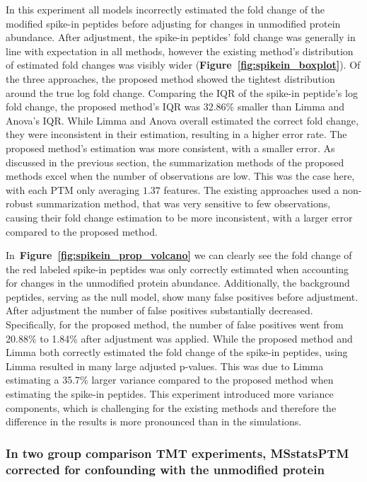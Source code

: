 \documentclass[mcp]{article}
\numberwithin{table}{section}
\def\figref#1{{\bf Figure~\ref{fig:#1}}}
\begin{document}
In this experiment all models incorrectly estimated the fold change of the modified spike-in peptides before adjusting for changes in unmodified protein abundance. After adjustment, the spike-in peptides' fold change was generally in line with expectation in all methods, however the existing method's distribution of estimated fold changes was visibly wider (\figref{spikein_boxplot}). Of the three approaches, the proposed method showed the tightest distribution around the true log fold change. Comparing the IQR of the spike-in peptide's log fold change, the proposed method's IQR was 32.86\% smaller than Limma and Anova's IQR. While Limma and Anova overall estimated the correct fold change, they were inconsistent in their estimation, resulting in a higher error rate. The proposed method's estimation was more consistent, with a smaller error. As discussed in the previous section, the summarization methods of the proposed methods excel when the number of observations are low. This was the case here, with each PTM only averaging $1.37$ features. The existing approaches used a non-robust summarization method, that was very sensitive to few observations, causing their fold change estimation to be more inconsistent, with a larger error compared to the proposed method.

In~\figref{spikein_prop_volcano} we can clearly see the fold change of the red labeled spike-in peptides was only correctly estimated when accounting for changes in the unmodified protein abundance. Additionally, the background peptides, serving as the null model, show many false positives before adjustment. After adjustment the number of false positives substantially decreased. Specifically, for the proposed method, the number of false positives went from 20.88\% to 1.84\% after adjustment was applied. While the proposed method and Limma both correctly estimated the fold change of the spike-in peptides, using Limma resulted in many large adjusted p-values. This was due to Limma estimating a 35.7\% larger variance compared to the proposed method when estimating the spike-in peptides. This experiment introduced more variance components, which is challenging for the existing methods and therefore the difference in the results is more pronounced than in the simulations.

\subsubsection*{In two group comparison TMT experiments, MSstatsPTM corrected for confounding with the unmodified protein}
\end{document}

